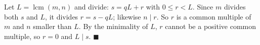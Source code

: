 Let $L=\operatorname{lcm}(m,n)$ and divide: $s=qL+r$ with $0\le r<L$. Since $m$ divides both $s$ and $L$, it divides $r=s-qL$; likewise $n\mid r$. So $r$ is a common multiple of $m$ and $n$ smaller than $L$. By the minimality of $L$, $r$ cannot be a positive common multiple, so $r=0$ and $L\mid s$. $\blacksquare$
